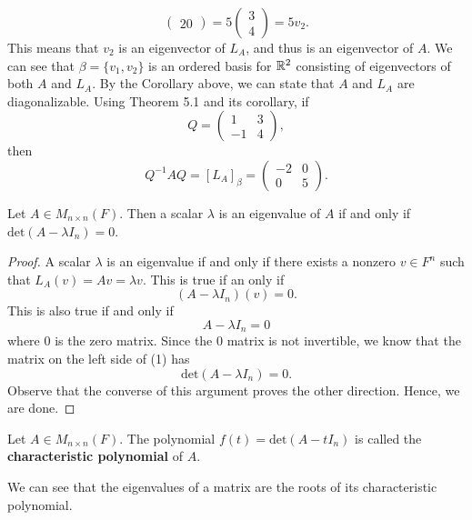 \begin{eg}
\[\begin{pmatrix}
                                   20 
                                  \end{pmatrix} = 5 \begin{pmatrix} 
                                             3 \\
                                             4 
                                            \end{pmatrix}  = 5 {v}_{2}. \] This means that \( {v}_{2} \) is an eigenvector of \( {L}_{A} \), and thus is an eigenvector of \( A  \). We can see that \( \beta = \{ {v}_{1}, {v}_{2} \}  \) is an ordered basis for \( \mathbb{R}^{2} \) consisting of eigenvectors of both \( A  \) and \( {L}_{A} \). By the Corollary above, we can state that \( A  \) and \( {L}_{A} \) are diagonalizable. Using Theorem 5.1 and its corollary, if  
                    \[ Q = \begin{pmatrix} 
                        1 & 3 \\
                        -1 & 4 
                              \end{pmatrix},   \]
                              then 
            \[  Q^{-1} A Q = [{L}_{A}]_{\beta} = \begin{pmatrix} 
                -2 & 0 \\
                0 & 5 
                      \end{pmatrix}. \]
\end{eg}

\begin{theorem}
    Let \( A \in {M}_{n \times n}(F) \). Then a scalar \( \lambda  \) is an eigenvalue of \( A  \) if and only if \( \text{det}(A - \lambda {I}_{n}) = 0  \).
\end{theorem}
\begin{proof}
A scalar \( \lambda  \) is an eigenvalue if and only if there exists a nonzero \( v \in F^{n} \) such that \( {L}_{A}(v) = Av = \lambda v  \). This is true if an only if
\[  (A - \lambda {I}_{n})(v) = 0.  \]
This is also true if and only if 
\[  A - \lambda {I}_{n} = 0 \tag{1}  \] where \( 0   \) is the zero matrix. Since the \( 0  \) matrix is not invertible, we know that the matrix on the left side of (1) has
\[  \text{det}(A - \lambda {I}_{n}) = 0. \] Observe that the converse of this argument proves the other direction. Hence, we are done.
\end{proof}

\begin{definition}
    Let \( A \in {M}_{n \times n}(F) \). The polynomial \( f(t) = \text{det}(A - t {I}_{n})   \) is called the \textbf{characteristic polynomial} of \( A  \).
\end{definition}
\begin{remark}
    We can see that the eigenvalues of a matrix are the roots of its characteristic polynomial. 
\end{remark}

